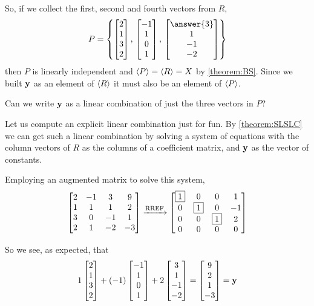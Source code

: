 \documentclass{ximera}
\begin{document}
\begin{example}
  So, if we collect the first, second and fourth vectors from $R$,
  \[
    P=\set{
      \colvector{ 2 \\ 1 \\ 3 \\ 2 },\,
      \colvector{ -1 \\ 1 \\ 0 \\ 1 },\,
      \colvector{ \answer{3} \\ 1 \\ -1 \\ -2 }
    }
  \]
  then $P$ is linearly independent and $\left\langle P\right\rangle=\left\langle R\right\rangle=X$ by
  \ref{theorem:BS}.  Since we built $\mathbf{y}$ as an element of
  $\left\langle R\right\rangle$ it must also be an element of $\left\langle P\right\rangle$.  

  \begin{question}
    Can we write
    $\mathbf{y}$ as a linear combination of just the three vectors in $P$?
    
    \begin{multipleChoice}
    \end{multipleChoice}

    \begin{feedback}[correct]
      Let us compute an explicit linear combination just for fun.  By
      \ref{theorem:SLSLC} we can get such a linear combination by
      solving a system of equations with the column vectors of $R$ as
      the columns of a coefficient matrix, and $\mathbf{y}$ as the
      vector of constants.

      Employing an augmented matrix to solve this system,
      \[
        \begin{bmatrix}
          2 & -1 & 3 & 9 \\
          1 & 1 & 1 & 2 \\
          3 & 0 & -1 & 1 \\
          2 & 1 & -2 & -3
        \end{bmatrix}
        \xrightarrow{\text{RREF}}
        \begin{bmatrix}
          \fbox{1} & 0  & 0 & 1 \\
          0 & \fbox{1} & 0 & -1 \\
          0 & 0 & \fbox{1} & 2 \\
          0 & 0 & 0 & 0
        \end{bmatrix}
      \]
      
      So we see, as expected, that
      \[
        1\begin{bmatrix} 2 \\ 1 \\ 3 \\ 2 \end{bmatrix}+
        (-1)\begin{bmatrix} -1 \\ 1 \\ 0 \\ 1 \end{bmatrix}+
        2\begin{bmatrix} 3 \\ 1 \\ -1 \\ -2 \end{bmatrix}
        =\begin{bmatrix}9 \\ 2 \\ 1 \\ -3\end{bmatrix}
        =\mathbf{y}
      \]
      

\end{feedback}
\end{question}
\end{example}
\end{document}
